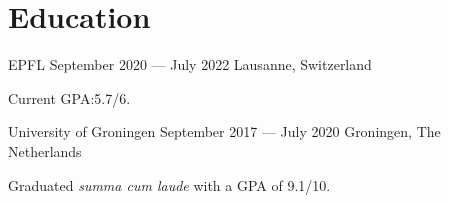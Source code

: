 \section*{Education}

\begin{cventries}
{EPFL} %
{September 2020 --- July 2022} %
{Lausanne, Switzerland} %
{%
  \begin{cvitems}
    \item Current GPA:\@ 5.7/6.
  \end{cvitems}
}
{University of Groningen}  %
{September 2017 --- July 2020} %
{Groningen, The Netherlands} %
{%
  \begin{cvitems}
    \item Graduated \textit{summa cum laude} with a GPA of 9.1/10.
  \end{cvitems}
}
\end{cventries}
